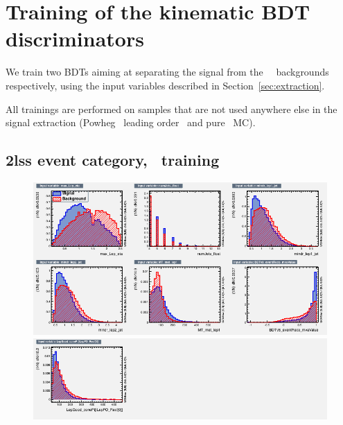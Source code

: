\section{Training of the kinematic BDT discriminators}
\label{app:BDTtraining}

We train two BDTs aiming at separating the signal from the \ttV\, \ttbar\ backgrounds respectively, using the input variables described in Section~\ref{sec:extraction}.

All trainings are performed on samples that are not used anywhere else in the signal extraction (Powheg \ttH\, leading order \ttV\, and pure \ttbar\ MC).

\subsection*{2lss event category, \ttbar\ training}
\begin{figure}[htb]
 \centering
 \includegraphics[width=\textwidth]{plots_extraction/training/train_2lss_ttbar_bdtv8_value/variables_id_c1}\\
 \includegraphics[width=\textwidth]{plots_extraction/training/train_2lss_ttbar_bdtv8_value/variables_id_c2}\\
\end{figure}
